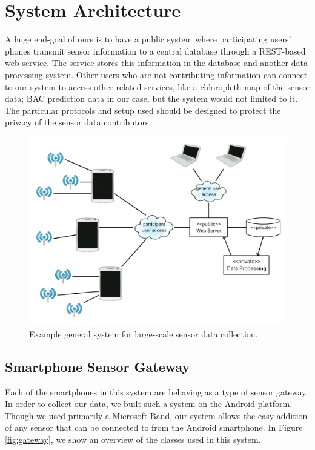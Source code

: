 \section{System Architecture}

A huge end-goal of ours is to have a public system where participating users' phones transmit sensor information to a central database through a REST-based web service. The service stores this information in the database and another data processing system. Other users who are not contributing information can connect to our system to access other related services, like a chloropleth map of the sensor data; BAC prediction data in our case, but the system would not limited to it. The particular protocols and setup used should be designed to protect the privacy of the sensor data contributors.

\begin{figure}
	\includegraphics[width=1.0\textwidth]{../figs/system}
	\caption{Example general system for large-scale sensor data collection.}
	\label{fig:system}
\end{figure}

\subsection{Smartphone Sensor Gateway}

Each of the smartphones in this system are behaving as a type of sensor gateway. In order to collect our data, we built such a system on the Android platform. Though we used primarily a Microsoft Band, our system allows the easy addition of any sensor that can be connected to from the Android smartphone. In Figure \ref{fig:gateway}, we show an overview of the classes used in this system.

